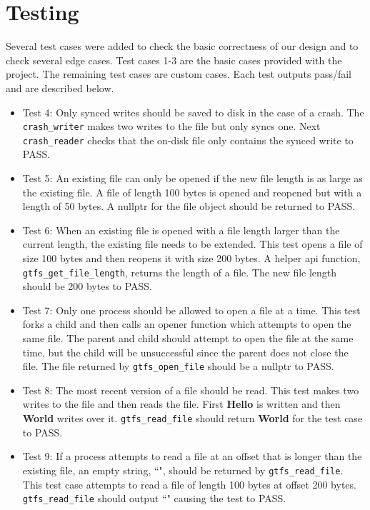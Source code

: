 \documentclass{article}
\begin{document}
\section*{Testing}
Several test cases were added to check the basic correctness of our design and to check several edge cases. Test cases 1-3 are the basic cases provided with the project. The remaining test cases are custom cases. Each test outputs pass/fail and are described below.
\begin{itemize}
    \item Test 4: Only synced writes should be saved to disk in the case of a crash. The \texttt{crash\_writer} makes two writes to the file but only syncs one. Next \texttt{crash\_reader} checks that the on-disk file only contains the synced write to PASS.
    \item Test 5: An existing file can only be opened if the new file length is as large as the existing file. A file of length 100 bytes is opened and reopened but with a length of 50 bytes. A nullptr for the file object should be returned to PASS.
    \item Test 6: When an existing file is opened with a file length larger than the current length, the existing file needs to be extended. This test opens a file of size 100 bytes and then reopens it with size 200 bytes. A helper api function, \texttt{gtfs\_get\_file\_length}, returns the length of a file. The new file length should be 200 bytes to PASS.
    \item Test 7: Only one process should be allowed to open a file at a time. This test forks a child and then calls an opener function which attempts to open the same file. The parent and child should attempt to open the file at the same time, but the child will be unsuccessful since the parent does not close the file. The file returned by \texttt{gtfs\_open\_file} should be a nullptr to PASS.
    \item Test 8: The most recent version of a file should be read. This test makes two writes to the file and then reads the file. First \textbf{Hello} is written and then \textbf{World} writes over it. \texttt{gtfs\_read\_file} should return \textbf{World} for the test case to PASS.
    \item Test 9: If a process attempts to read a file at an offset that is longer than the existing file, an empty string, ``", should be returned by \texttt{gtfs\_read\_file}. This test case attempts to read a file of length 100 bytes at offset 200 bytes. \texttt{gtfs\_read\_file} should output ``" causing the test to PASS.
\end{itemize}
\end{document}
